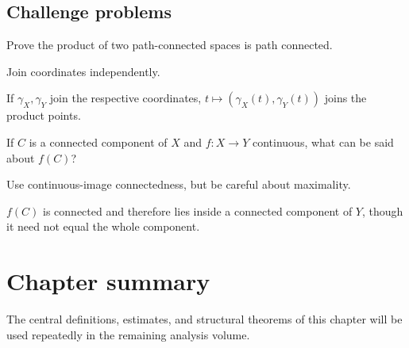 \subsection*{Challenge problems}

\begin{exercise}\label{exr:ii07-expand-15}
Prove the product of two path-connected spaces is path connected.
\end{exercise}
\begin{hint}
Join coordinates independently.
\end{hint}
\begin{solution}
If \(\gamma_X,\gamma_Y\) join the respective coordinates, \(t\mapsto(\gamma_X(t),\gamma_Y(t))\) joins the product points.
\end{solution}

\begin{exercise}\label{exr:ii07-expand-16}
If \(C\) is a connected component of \(X\) and \(f:X\to Y\) continuous, what can be said about \(f(C)\)?
\end{exercise}
\begin{hint}
Use continuous-image connectedness, but be careful about maximality.
\end{hint}
\begin{solution}
\(f(C)\) is connected and therefore lies inside a connected component of \(Y\), though it need not equal the whole component.
\end{solution}
\section*{Chapter summary}
The central definitions, estimates, and structural theorems of this chapter will be used repeatedly in the remaining analysis volume.
